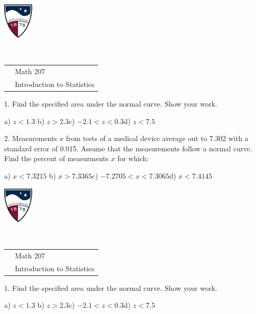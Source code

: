 \documentclass[10pt]{article}
\begin{document}
\pagestyle{empty}

\href{http://www.su.edu}{\includegraphics[height=1.75cm]{sulogo.eps}}
\vspace{-1.69cm}

{\small{\ }\hfill
\begin{tabular}{cl}
& Math 207\\
& Introduction to Statistics\\
\end{tabular}
}
\vspace{.3in}

{\setlength{\baselineskip}{1.05\baselineskip}
 1. Find the specified area under the normal curve.  Show your work.
 
\hfill a) $z<1.3$ \hfill b) $z>2.3$\hfill c) $-2.1 < z < 0.3$\hfill d) $z<7.5$\hspace{.5in}
\vspace{1in}

2. Measurements $x$ from tests of a medical device average out to 7.302 with a standard error of 0.015.
Assume that the measurements follow a normal curve.  Find the percent of measurments $x$ for which:
 
\hfill a) $x<7.3215$ \hfill b) $x>7.3365$\hfill c) $-7.2705 < x < 7.3065$\hfill d) $x<7.4145$\hspace{.5in}

\vfill

\href{http://www.su.edu}{\includegraphics[height=1.75cm]{sulogo.eps}}
\vspace{-1.69cm}

{\small{\ }\hfill
\begin{tabular}{cl}
& Math 207\\
& Introduction to Statistics\\
\end{tabular}
}
\vspace{.3in}

 1. Find the specified area under the normal curve.  Show your work.
 
\hfill a) $z<1.3$ \hfill b) $z>2.3$\hfill c) $-2.1 < z < 0.3$\hfill d) $z<7.5$\hspace{.5in}
\vspace{1in}

}
\end{document}
